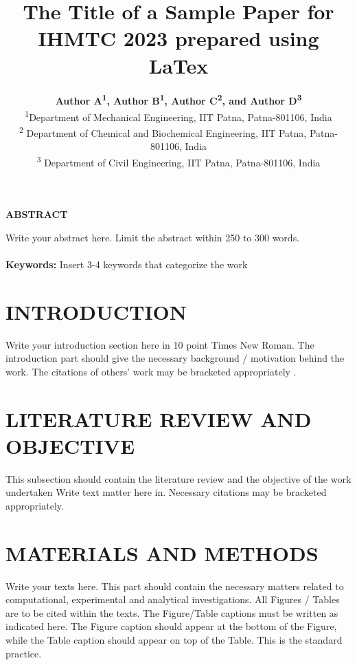\documentclass[10pt, conference]{IHMTC2023}
\begin{document}
\title{\LARGE{ \bf The Title of a Sample Paper for IHMTC 2023 prepared using LaTex}\vspace{-9mm}}
\author{\textbf{Author A\textsuperscript{1}, Author B\textsuperscript{1}, Author C\textsuperscript{2}, and Author D\textsuperscript{3}}\\
\textsuperscript{1}\small{Department of Mechanical Engineering, IIT Patna, Patna-801106, India }\\
\textsuperscript{2} \small{Department of Chemical and Biochemical Engineering, IIT Patna, Patna-801106, India }\\
\textsuperscript{3} \small{Department of Civil Engineering, IIT Patna, Patna-801106, India }}

\maketitle
\thispagestyle{fancy} 
\pagestyle{plain} %

\noindent \textbf{ABSTRACT}

Write your abstract here. Limit the abstract within 250 to 300 words.    
\\\\
\noindent
\textbf{Keywords:} Insert 3-4 keywords that categorize the work\\

\section{{\textbf{INTRODUCTION}}}

Write your introduction section here in 10 point Times New Roman. The introduction part should give the necessary background / motivation behind the work. The citations of others’ work may be bracketed  \cite{Gsell2017,Panton2009} appropriately \cite{Pascal2000}. 

\section{\textbf{LITERATURE REVIEW AND OBJECTIVE}}\label{sec2}
This subsection should contain the literature review and the objective of the work undertaken Write text matter here in. Necessary citations may be bracketed \cite{Panton2009,raj2013wettability,prasanna2020analysis,suman2015performance,Pascal2000} appropriately. 


\section{\textbf{MATERIALS AND METHODS}}
Write your texts here. This part should contain the necessary matters related to computational, experimental and analytical investigations. All Figures / Tables are to be cited within the texts. The Figure/Table captions must be written as indicated here. The Figure caption should appear at the bottom of the Figure, while the Table caption should appear on top of the Table. This is the standard practice.
\end{document}
